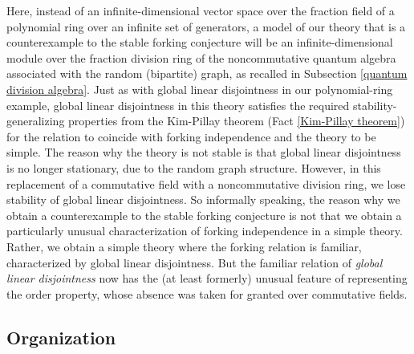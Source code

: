 \documentclass{amsart}
\theoremstyle{definition}
\theoremstyle{remark}
\numberwithin{equation}{section}
\begin{document}
Here, instead of an infinite-dimensional vector space over the fraction field of a polynomial ring  over an infinite set of generators, a model of our theory that is a counterexample to the stable forking conjecture will be an infinite-dimensional module over the fraction division ring of the noncommutative quantum algebra associated with the random (bipartite) graph, as recalled in Subsection \ref{quantum division algebra}. Just as with global linear disjointness in our polynomial-ring example, global linear disjointness in this theory satisfies the required stability-generalizing properties from the Kim-Pillay theorem (Fact \ref{Kim-Pillay theorem}) for the relation to coincide with forking independence and the theory to be simple. The reason why the theory is not stable is that global linear disjointness is no longer stationary, due to the random graph structure. However, in this replacement of a commutative field with a noncommutative division ring, we lose stability of global linear disjointness. So informally speaking, the reason why we obtain a counterexample to the stable forking conjecture is not that we obtain a particularly unusual characterization of forking independence in a simple theory. Rather, we obtain a simple theory where the forking relation is familiar, characterized by global linear disjointness. But the familiar relation of \textit{global linear disjointness} now has the (at least formerly) unusual feature of representing the order property, whose absence was taken for granted over commutative fields.


\subsection{Organization}
\end{document}
